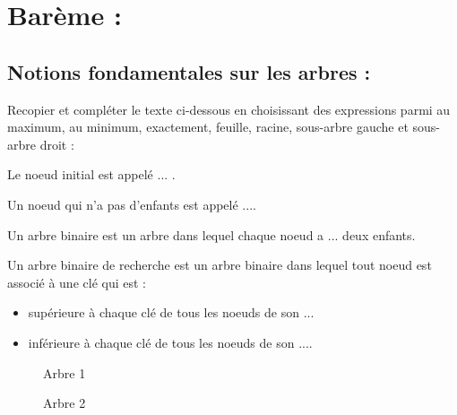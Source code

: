 \documentclass[a4paper, noanswers, addpoints, 12pt]{exam}
\begin{document}
\section*{Barème :}
\begin{center}
  \par\bigskip
  \gradetable[h]
\end{center}
\begin{questions}

\section{Notions fondamentales sur les arbres : }

\question[2] Recopier et compléter le texte ci-dessous en choisissant des expressions parmi
au maximum, au minimum, exactement, feuille, racine, sous-arbre
gauche et sous-arbre droit :
\begin{parts}
    \item Le noeud initial est appelé ... . 
    \item Un noeud qui n'a pas d'enfants est appelé ....
    \item Un arbre binaire est un arbre dans lequel chaque noeud a ... deux enfants.
    \item Un arbre binaire de recherche est un arbre binaire dans lequel tout
    noeud est associé à une clé qui est :
    \begin{itemize}
        \item supérieure à chaque clé de tous les noeuds de son ...
        \item inférieure à chaque clé de tous les noeuds de son ....
    \end{itemize}
\end{parts}

\newpage

\begin{figure}
    \centering
    {\centering
    
    \par}
    \caption{Arbre 1}
    \label{fig:arbre1}
\end{figure}

\begin{figure}
    \centering
    {\centering
    
    \par}
    \caption{Arbre 2}
    \label{fig:arbre2}
\end{figure}


\end{questions}
\end{document}
